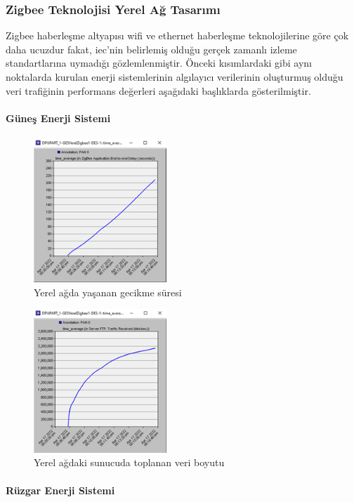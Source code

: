 \newpage
\subsubsection{Zigbee Teknolojisi Yerel Ağ Tasarımı}\label{zigbee}


Zigbee haberleşme altyapısı \gls{wifi} ve ethernet haberleşme teknolojilerine göre çok daha ucuzdur fakat, \gls{iec}'nin belirlemiş olduğu gerçek zamanlı izleme standartlarına uymadığı gözlemlenmiştir. Önceki kısımlardaki gibi aynı noktalarda kurulan enerji sistemlerinin algılayıcı verilerinin oluşturmuş olduğu veri trafiğinin performans değerleri aşağıdaki başlıklarda gösterilmiştir.


\paragraph{Güneş Enerji Sistemi}

\begin{figure}[htbp]
\centerline{\includegraphics[width=5cm]{Resim/Sekil4-22.png}}
\caption{Yerel ağda yaşanan gecikme süresi}
\label{fig:4-23}
\end{figure}

\begin{figure}[htbp]
\centerline{\includegraphics[width=5cm]{Resim/Sekil4-23.png}}
\caption{Yerel ağdaki sunucuda toplanan veri boyutu}
\label{fig:4-24}
\end{figure}


\paragraph{Rüzgar Enerji Sistemi}

